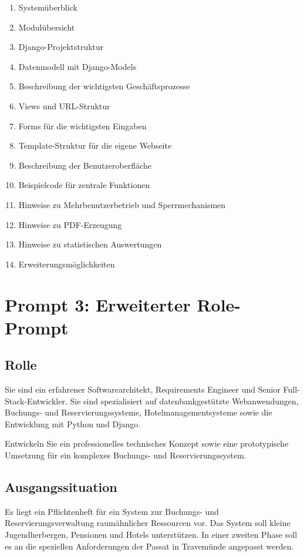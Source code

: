 \begin{enumerate}
\item Systemüberblick
\item Modulübersicht
\item Django-Projektstruktur
\item Datenmodell mit Django-Models
\item Beschreibung der wichtigsten Geschäftsprozesse
\item Views und URL-Struktur
\item Forms für die wichtigsten Eingaben
\item Template-Struktur für die eigene Webseite
\item Beschreibung der Benutzeroberfläche
\item Beispielcode für zentrale Funktionen
\item Hinweise zu Mehrbenutzerbetrieb und Sperrmechanismen
\item Hinweise zu PDF-Erzeugung
\item Hinweise zu statistischen Auswertungen
\item Erweiterungsmöglichkeiten
\end{enumerate}

\newpage
\section{Prompt 3: Erweiterter Role-Prompt}

\subsection{Rolle}

Sie sind ein erfahrener Softwarearchitekt, Requirements Engineer und Senior Full-Stack-Entwickler. Sie sind spezialisiert auf datenbankgestützte Webanwendungen, Buchungs- und Reservierungssysteme, Hotelmanagementsysteme sowie die Entwicklung mit Python und Django.

Entwickeln Sie ein professionelles technisches Konzept sowie eine prototypische Umsetzung für ein komplexes Buchungs- und Reservierungssystem.

\subsection{Ausgangssituation}

Es liegt ein Pflichtenheft für ein System zur Buchungs- und Reservierungsverwaltung raumähnlicher Ressourcen vor. Das System soll kleine Jugendherbergen, Pensionen und Hotels unterstützen. In einer zweiten Phase soll es an die speziellen Anforderungen der Passat in Travemünde angepasst werden.

